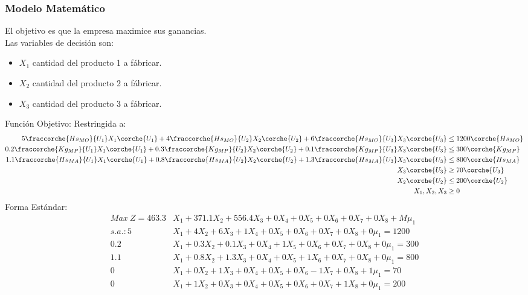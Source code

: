 

\begin{homeworkProblem}[-1][Empresita]
\subsubsection{Modelo Matemático}
El objetivo es que la empresa maximice sus ganancias.\\
Las variables de decisión son:
\begin{itemize}
    \item $X_1$ cantidad del producto 1 a fábricar.
    \item $X_2$ cantidad del producto 2 a fábricar.
    \item $X_3$ cantidad del producto 3 a fábricar.
\end{itemize}
Función Objetivo:
Restringida a:
\begin{align*}
    5\fraccorche{Hs_{MO}}{U_1}X_1\corche{U_1} + 4\fraccorche{Hs_{MO}}{U_2}X_2\corche{U_2} + 6\fraccorche{Hs_{MO}}{U_3}X_3\corche{U_3} &\le 1200\corche{Hs_{MO}} \\
    0.2\fraccorche{Kg_{MP}}{U_1}X_1\corche{U_1} + 0.3\fraccorche{Kg_{MP}}{U_2}X_2\corche{U_2} + 0.1\fraccorche{Kg_{MP}}{U_3}X_3\corche{U_3} &\le 300\corche{Kg_{MP}} \\
    1.1\fraccorche{Hs_{MA}}{U_1}X_1\corche{U_1} + 0.8\fraccorche{Hs_{MA}}{U_2}X_2\corche{U_2} + 1.3\fraccorche{Hs_{MA}}{U_3}X_3\corche{U_3} &\le 800\corche{Hs_{MA}} \\
    X_3\corche{U_3} &\ge 70\corche{U_3} \\
    X_2\corche{U_2} &\le 200\corche{U_2} \\
    X_1,X_2,X_3 &\ge 0
\end{align*}
Forma Estándar: 
\begin{align*}
    Max\ Z = 463.3&X_1 + 371.1X_2 + 556.4X_3 + 0X_4 + 0X_5 + 0X_6 + 0X_7 + 0X_8 + M\mu_1 \\
    s.a.: 5&X_1 + 4X_2 + 6X_3 + 1X_4 + 0X_5 + 0X_6 + 0X_7 + 0X_8 + 0\mu_1 = 1200 \\
    0.2&X_1 + 0.3X_2 + 0.1X_3 + 0X_4 + 1X_5 + 0X_6 + 0X_7 + 0X_8 + 0\mu_1 = 300 \\
    1.1&X_1 + 0.8X_2 + 1.3X_3 + 0X_4 + 0X_5 + 1X_6 + 0X_7 + 0X_8 + 0\mu_1 = 800 \\
    0&X_1 + 0X_2 + 1X_3 + 0X_4 + 0X_5 + 0X_6 - 1X_7 + 0X_8 + 1\mu_1 = 70 \\
    0&X_1 + 1X_2 + 0X_3 + 0X_4 + 0X_5 + 0X_6 + 0X_7 + 1X_8 + 0\mu_1 = 200 \\
\end{align*}

\end{homeworkProblem}
